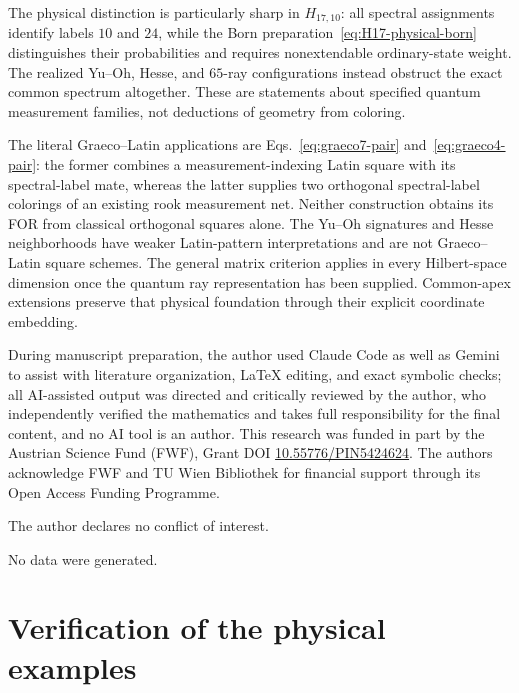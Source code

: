 \documentclass[aps,pra,reprint,superscriptaddress,longbibliography,nofootinbib,floatfix,10pt]{revtex4-2}
\theoremstyle{definition}\newtheorem{definition}[theorem]{Definition}
\theoremstyle{remark}\newtheorem{remark}[theorem]{Remark}
\begin{document}
The physical distinction is particularly sharp in $H_{17,10}$: all spectral assignments identify labels $10$ and $24$, while the Born preparation~\eqref{eq:H17-physical-born} distinguishes their probabilities and requires nonextendable ordinary-state weight. The realized Yu--Oh, Hesse, and $65$-ray configurations instead obstruct the exact common spectrum altogether. These are statements about specified quantum measurement families, not deductions of geometry from coloring.

The literal Graeco--Latin applications are Eqs.~\eqref{eq:graeco7-pair} and~\eqref{eq:graeco4-pair}: the former combines a measurement-indexing Latin square with its spectral-label mate, whereas the latter supplies two orthogonal spectral-label colorings of an existing rook measurement net. Neither construction obtains its FOR from classical orthogonal squares alone. The Yu--Oh signatures and Hesse neighborhoods have weaker Latin-pattern interpretations and are not Graeco--Latin square schemes. The general matrix criterion applies in every Hilbert-space dimension once the quantum ray representation has been supplied. Common-apex extensions preserve that physical foundation through their explicit coordinate embedding.


\begin{acknowledgments}
During manuscript preparation, the author used Claude Code as well as Gemini to assist with literature organization,
LaTeX editing, and exact symbolic checks;
all AI-assisted output was directed and critically reviewed by the author,
 who independently verified the mathematics and takes full responsibility for the final content, and no AI tool is an author.
This research was funded in part by the Austrian
Science Fund (FWF), Grant DOI \href{https://doi.org/10.55776/PIN5424624}{10.55776/PIN5424624}.
The authors acknowledge FWF and TU Wien Bibliothek for financial support through its Open Access Funding Programme.

The author declares no conflict of interest.

No data were generated.
\end{acknowledgments}


\clearpage
\appendix
\section{Verification of the physical examples}\label{app:verification}
\end{document}
